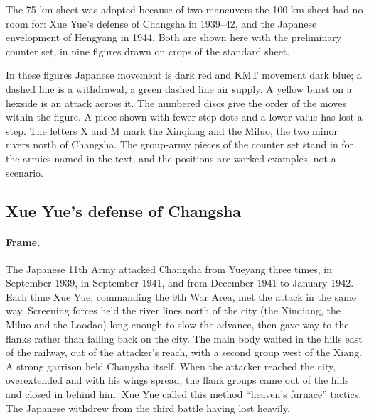 The 75 km sheet was adopted because of two maneuvers the 100 km sheet had no room for: Xue Yue's defense of Changsha in 1939--42, and the Japanese envelopment of Hengyang in 1944. Both are shown here with the preliminary counter set, in nine figures drawn on crops of the standard sheet.

In these figures Japanese movement is dark red and KMT movement dark blue; a dashed line is a withdrawal, a green dashed line air supply. A yellow burst on a hexside is an attack across it. The numbered discs give the order of the moves within the figure. A piece shown with fewer step dots and a lower value has lost a step. The letters X and M mark the Xinqiang and the Miluo, the two minor rivers north of Changsha. The group-army pieces of the counter set stand in for the armies named in the text, and the positions are worked examples, not a scenario.


\clearpage
{}
\subsection{Xue Yue's defense of Changsha}
\paragraph{Frame.} The Japanese 11th Army attacked Changsha from Yueyang three times, in September 1939, in September 1941, and from December 1941 to January 1942. Each time Xue Yue, commanding the 9th War Area, met the attack in the same way. Screening forces held the river lines north of the city (the Xinqiang, the Miluo and the Laodao) long enough to slow the advance, then gave way to the flanks rather than falling back on the city. The main body waited in the hills east of the railway, out of the attacker's reach, with a second group west of the Xiang. A strong garrison held Changsha itself. When the attacker reached the city, overextended and with his wings spread, the flank groups came out of the hills and closed in behind him. Xue Yue called this method ``heaven's furnace'' tactics. The Japanese withdrew from the third battle having lost heavily.
